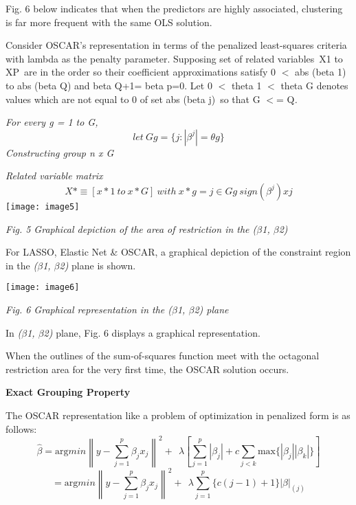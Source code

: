 \documentclass{article} %
\begin{document}
\noindent Fig. 6 below indicates that when the predictors are highly associated, clustering is far more frequent with the same OLS solution.

\noindent Consider OSCAR's representation in terms of the penalized least-squares criteria with lambda as the penalty parameter. Supposing set of related variables~X1 to XP~are in the order so their coefficient approximations satisfy 0 $\mathrm{<}$ abs (beta 1) to abs (beta Q) and beta Q+1= beta p=0. Let 0 $\mathrm{<}$ theta 1 $\mathrm{<}$ theta G denotes values which are not equal to 0 of set abs (beta j)~so that G $\mathrm{<}$= Q\textit{.}

\noindent 

\noindent \textit{For every g = 1 to G,}
\[let\ Gg=\{j:\left|{\beta }^j\right|=\theta g\}\] 
\textit{Constructing group n x G}

\noindent \textit{Related variable matrix }
\[X*\equiv \left[x*1\ to\ x*G\right]\ with\ x*g=j\in Gg\ sign({\beta }^j)xj\] 
\texttt{[image: image5]}

\noindent \textit{Fig. 5 Graphical depiction of the area of restriction in the ($\beta$1, $\beta$2)}

\noindent 

\noindent For LASSO, Elastic Net \& OSCAR, a graphical depiction of the constraint region in the \textit{($\beta$1, $\beta$2)} plane is shown.

\noindent \texttt{[image: image6]}

\noindent \textit{Fig. 6 Graphical representation in the ($\beta$1, $\beta$2) plane}

\noindent In \textit{($\beta$1, $\beta$2)} plane, Fig. 6 displays a graphical representation.

\noindent When the outlines of the sum-of-squares function meet with the octagonal restriction area for the very first time, the OSCAR solution occurs.

\noindent \textbf{Exact Grouping Property}

\noindent The OSCAR representation like a problem of optimization in penalized form is as follows:
\[\widehat{\beta }={\mathrm{arg} min{\left\|y-\sum^p_{j=1}{{\beta }_jx_j}\right\|}^2+\ \ }\lambda \left[\sum^p_{j=1}{\left|{\beta }_j\right|+c\sum_{j<k}{\mathrm{max}\mathrm{}\{\left|{\beta }_j\right|\left|{\beta }_k\right|\}}}\right]\] 
\begin{equation} \label{GrindEQ__15_} 
={\mathrm{arg} min{\left\|y-\sum^p_{j=1}{{\beta }_jx_j}\right\|}^2+\ \ }\lambda \sum^p_{j=1}{\{c\left(j-1\right)+1\}{\left|\beta \right|}_{(j)}} 
\end{equation} 
\end{document}

